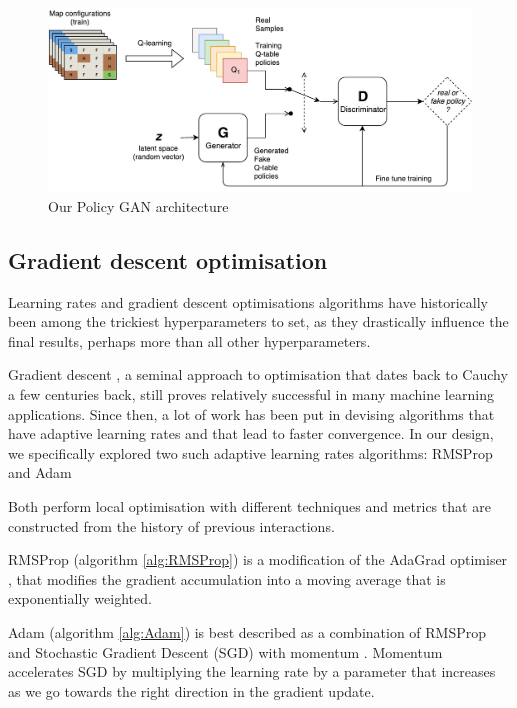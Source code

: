 
\begin{figure}
\centering
\includegraphics[width=15cm]{Figures/PolicyGAN}
\caption{Our Policy GAN architecture}
\label{fig:PolicyGAN}
\end{figure}

\subsection{Gradient descent optimisation}
Learning rates and gradient descent optimisations algorithms have historically been among the trickiest hyperparameters to set, as they drastically influence the final results, perhaps more than all other hyperparameters.

Gradient descent \citep{lemarechal2012cauchy}, a seminal approach to optimisation that dates back to Cauchy a few centuries back, still proves relatively successful in many machine learning applications.
Since then, a lot of work has been put in devising algorithms that have adaptive learning rates and that lead to faster convergence. In our design, we specifically explored two such adaptive learning rates algorithms: RMSProp \citep{hinton2012neural} and Adam \citep{DBLP:journals/corr/KingmaB14}

Both perform local optimisation with different techniques and metrics that are constructed from the history of previous interactions.

RMSProp (algorithm \ref{alg:RMSProp}) is a modification of the AdaGrad optimiser \citep{duchi2011adaptive}, that modifies the gradient accumulation into a moving average that is exponentially weighted.

Adam (algorithm \ref{alg:Adam}) is best described as a combination of RMSProp and Stochastic Gradient Descent (SGD) with momentum \citep{sutskever2013importance}. Momentum accelerates SGD by multiplying the learning rate by a parameter that increases as we go towards the right direction in the gradient update.

